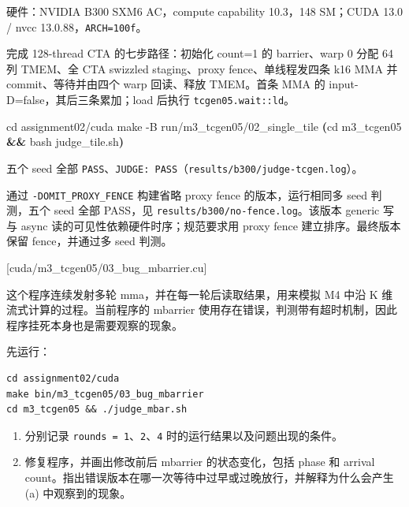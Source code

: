\documentclass[11pt,a4paper,fontset=fandol]{ctexart}
\newenvironment{Shaded}{}{}
\newcommand{\AttributeTok}[1]{\textcolor[rgb]{0.49,0.56,0.16}{#1}}
\newcommand{\BuiltInTok}[1]{\textcolor[rgb]{0.00,0.50,0.00}{#1}}
\newcommand{\FunctionTok}[1]{\textcolor[rgb]{0.02,0.16,0.49}{#1}}
\newcommand{\KeywordTok}[1]{\textcolor[rgb]{0.00,0.44,0.13}{\textbf{#1}}}
\newcommand{\NormalTok}[1]{#1}
\begin{document}
\begin{answer}

硬件：NVIDIA B300 SXM6 AC，compute capability 10.3，148 SM；CUDA 13.0 /
nvcc 13.0.88，\texttt{ARCH=\allowbreak{}100f}。

完成 128-thread CTA 的七步路径：初始化 count=1 的 barrier、warp 0 分配
64 列 TMEM、全 CTA swizzled staging、proxy fence、单线程发四条 k16 MMA
并 commit、等待并由四个 warp 回读、释放 TMEM。首条 MMA 的
input-D=false，其后三条累加；load 后执行
\texttt{tcgen05.\allowbreak{}wait:\allowbreak{}:\allowbreak{}ld}。

\begin{Shaded}
\begin{Highlighting}[]
\BuiltInTok{cd}\NormalTok{ assignment02/cuda}
\FunctionTok{make} \AttributeTok{{-}B}\NormalTok{ run/m3\_tcgen05/02\_single\_tile}
\KeywordTok{(}\BuiltInTok{cd}\NormalTok{ m3\_tcgen05 }\KeywordTok{\&\&} \FunctionTok{bash}\NormalTok{ judge\_tile.sh}\KeywordTok{)}
\end{Highlighting}
\end{Shaded}

五个 seed 全部
\texttt{PASS}、\texttt{JUDGE:\allowbreak{}\ PASS}（\texttt{results/\allowbreak{}b300/\allowbreak{}judge-\allowbreak{}tcgen.\allowbreak{}log}）。

通过
\texttt{-\allowbreak{}DOMIT\_\allowbreak{}PROXY\_\allowbreak{}FENCE}
构建省略 proxy fence 的版本，运行相同多 seed 判测，五个 seed 全部
PASS，见
\texttt{results/\allowbreak{}b300/\allowbreak{}no-\allowbreak{}fence.\allowbreak{}log}。该版本
generic 写与 async 读的可见性依赖硬件时序；规范要求用 proxy fence
建立排序。最终版本保留 fence，并通过多 seed 判测。

\end{answer}

[cuda/m3\_tcgen05/03\_bug\_mbarrier.cu]

这个程序连续发射多轮 mma，并在每一轮后读取结果，用来模拟 M4 中沿 K
维流式计算的过程。当前程序的 mbarrier
使用存在错误，判测带有超时机制，因此程序挂死本身也是需要观察的现象。

先运行：

\begin{verbatim}
cd assignment02/cuda
make bin/m3_tcgen05/03_bug_mbarrier
cd m3_tcgen05 && ./judge_mbar.sh
\end{verbatim}

\begin{enumerate}
\def\labelenumi{(\alph{enumi})}
\item
  分别记录 \texttt{rounds\ =\allowbreak{}\ 1}、\texttt{2}、\texttt{4}
  时的运行结果以及问题出现的条件。
\item
  修复程序，并画出修改前后 mbarrier 的状态变化，包括 phase 和 arrival
  count。指出错误版本在哪一次等待中过早或过晚放行，并解释为什么会产生
  (a) 中观察到的现象。
\end{enumerate}
\end{document}
